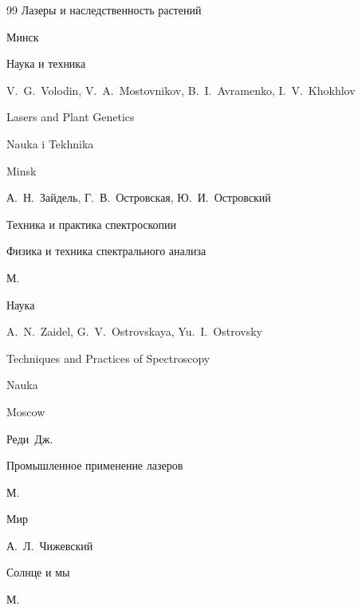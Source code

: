 \begin{thebibliography}{99}
\book Лазеры и наследственность растений

\publaddr Минск

\publ Наука и техника



\misctransl

\by  V.~G.~Volodin, V.~A.~Mostovnikov, B.~I.~Avramenko, I.~V.~Khokhlov

\book Lasers and Plant Genetics 

\publ Nauka i Tekhnika

\publaddr Minsk 








\by А.~Н.~Зайдель, Г.~В.~Островская, Ю.~И.~Островский

\book Техника и практика спектроскопии

\serial Физика и техника спектрального анализа

\publaddr М.

\publ Наука



\misctransl

\by A.~N.~Zaidel, G.~V.~Ostrovskaya, Yu.~I.~Ostrovsky

\book Techniques and Practices of Spectroscopy

\publ Nauka


\publaddr Moscow







\by Реди~Дж.

\book Промышленное применение лазеров

\publaddr М.

\publ Мир






\by А.~Л.~Чижевский

\book Солнце и мы

\publaddr М.


\end{thebibliography}

